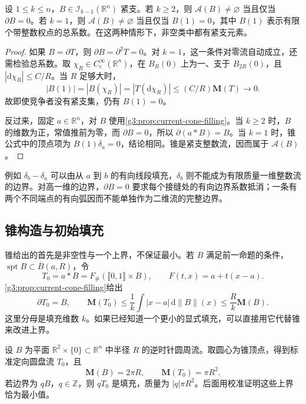 \begin{proposition}\label{g3:prop:euclidean-fillability}
	设 \(1\le k\le n\)，\(B\in\mathcal I_{k-1}(\mathbb R^n)\) 紧支。若 \(k\ge2\)，则 \(\mathcal A(B)\ne\varnothing\) 当且仅当 \(\partial B=0\)。若 \(k=1\)，则 \(\mathcal A(B)\ne\varnothing\) 当且仅当 \(B(1)=0\)，其中 \(B(1)\) 表示有限个带整数权点的总系数。在这两种情形下，非空类中都有紧支元素。
\end{proposition}
\begin{proof}
	如果 \(B=\partial T\)，则 \(\partial B=\partial^2T=0\)。对 \(k=1\)，这一条件对零流自动成立，还需检验总系数。取 \(\chi_R\in C_c^\infty(\mathbb R^n)\)，在 \(B_R(0)\) 上为一、支于 \(B_{2R}(0)\)，且 \(|\mathrm d\chi_R|\le C/R\)。当 \(R\) 足够大时，
	\[
		|B(1)|=|B(\chi_R)|=|T(\mathrm d\chi_R)|
		\le (C/R)\mathbf M(T)\longrightarrow0.
	\]
	故即使竞争者没有紧支集，仍有 \(B(1)=0\)。

	反过来，固定 \(a\in\mathbb R^n\)，对 \(B\) 使用\cref{g3:prop:current-cone-filling}。当 \(k\ge2\) 时，\(B\) 的维数为正，常值推前为零，而 \(\partial B=0\)，所以 \(\partial(a*B)=B\)。当 \(k=1\) 时，锥公式中的顶点项为 \(B(1)\delta_a=0\)，结论相同。锥是紧支整数流，因而属于 \(\mathcal A(B)\)。
\end{proof}

例如 \(\delta_b-\delta_a\) 可以由从 \(a\) 到 \(b\) 的有向线段填充，\(\delta_b\) 则不能成为有限质量一维整数流的边界。对高一维的边界，\(\partial B=0\) 要求每个接缝处的有向边界系数抵消；一条有两个不同端点的有向弧因而不能单独作为二维流的完整边界。

\subsection{锥构造与初始填充}
\label{g3:subsec:2301:02}
锥给出的首先是非空性与一个上界，不保证最小。若 \(B\) 满足前一命题的条件，\(\operatorname{spt}B\subset\overline B(a,R)\)，令
\[
	T_0=a*B=F_\#(\lBrack0,1\rBrack\times B),\qquad
	F(t,x)=a+t(x-a).
\]
\cref{g3:prop:current-cone-filling}给出
\begin{equation}\label{g3:eq:plateau-cone-upper-bound}
	\partial T_0=B,\qquad
	\mathbf M(T_0)\le\frac1k\int|x-a|\,\mathrm d\|B\|(x)
	\le\frac Rk\mathbf M(B).
\end{equation}
这里分母是填充维数 \(k\)。如果已经知道一个更小的显式填充，可以直接用它代替锥来改进上界。

\begin{example}\label{g3:exm:plateau-disk-initial}
	设 \(B\) 为平面 \(\mathbb R^2\times\{0\}\subset\mathbb R^n\) 中半径 \(R\) 的逆时针圆周流。取圆心为锥顶点，得到标准定向圆盘流 \(T_0\)，且
	\[
		\mathbf M(B)=2\pi R,\qquad \mathbf M(T_0)=\pi R^2.
	\]
	若边界为 \(qB\)，\(q\in\mathbb Z\)，则 \(qT_0\) 是填充，质量为 \(|q|\pi R^2\)。后面用校准证明这些上界恰为最小值。
\end{example}


